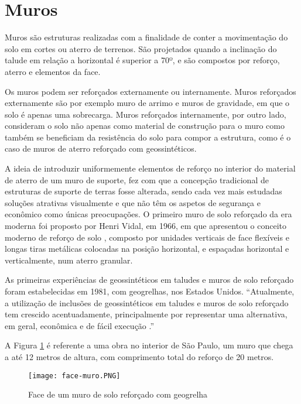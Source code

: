 \section{Muros}

Muros são estruturas realizadas com a finalidade de conter a movimentação do solo em cortes ou aterro de terrenos. São projetados quando a inclinação do talude em relação a horizontal é superior a 70º, e são compostos por reforço, aterro e elementos da face.

Os muros podem ser reforçados externamente ou internamente. Muros reforçados externamente são por exemplo muro de arrimo e muros de gravidade, em que o solo é apenas uma sobrecarga. Muros reforçados internamente, por outro lado, consideram o solo não apenas como material de construção para o muro como também se beneficiam da resistência do solo para compor a estrutura, como é o caso de muros de aterro reforçado com geossintéticos.

A ideia de introduzir uniformemente elementos de reforço no interior do material de aterro de um muro de suporte,  fez com que a concepção tradicional de estruturas de suporte de terras fosse alterada, sendo cada vez mais estudadas soluções atrativas visualmente e que não têm os aspetos de segurança e econômico como únicas preocupações. O primeiro muro de solo reforçado da era moderna foi proposto por Henri Vidal, em 1966, em que apresentou o conceito moderno de reforço de solo \cite{vidal:article}, composto por unidades verticais de face flexíveis e longas tiras metálicas colocadas na posição horizontal, e espaçadas horizontal e verticalmente, num aterro granular. 

As primeiras experiências de geossintéticos em taludes e muros de solo reforçado foram estabelecidas em 1981, com geogrelhas, nos Estados Unidos. “Atualmente, a utilização de inclusões de geossintéticos em taludes e muros de solo reforçado tem crescido acentuadamente, principalmente por representar uma alternativa, em geral, econômica e de fácil execução \cite{elias:article}.”

A Figura \ref{fig:face-muro} é referente a uma obra no interior de São Paulo, um muro que chega a até 12 metros de altura, com comprimento total do reforço de 20 metros.

\begin{figure}[htb]
 \caption{Face de um muro de solo reforçado com geogrelha}
 \label{fig:face-muro}
 \centering
 \texttt{[image: face-muro.PNG]}
\end{figure}

